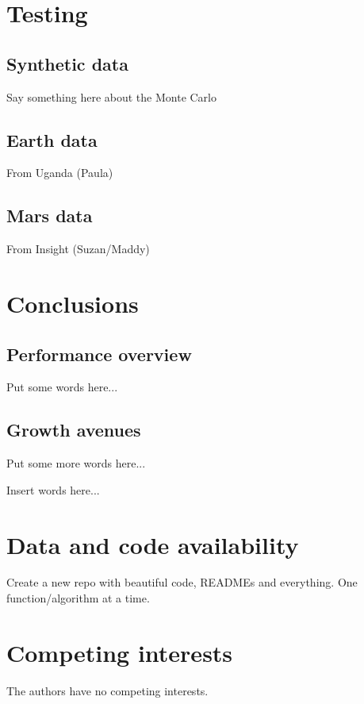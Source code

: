 \documentclass[preprint]{seismica}
\begin{document}
\section{Testing} \label{sec:example}

    \subsection{Synthetic data}
      Say something here about the Monte Carlo
    
    \subsection{Earth data}
      From Uganda (Paula)

    \subsection{Mars data}
      From Insight (Suzan/Maddy)

\section{Conclusions} \label{sec:conclusion}

    \subsection{Performance overview}
      Put some words here...

    \subsection{Growth avenues}
      Put some more words here...

\begin{acknowledgements}
    [Suzan] Insert words here...
\end{acknowledgements}

\section*{Data and code availability}
Create a new repo with beautiful code, READMEs and everything. One function/algorithm at a time.

\section*{Competing interests}
    The authors have no competing interests.


   
\end{document}
